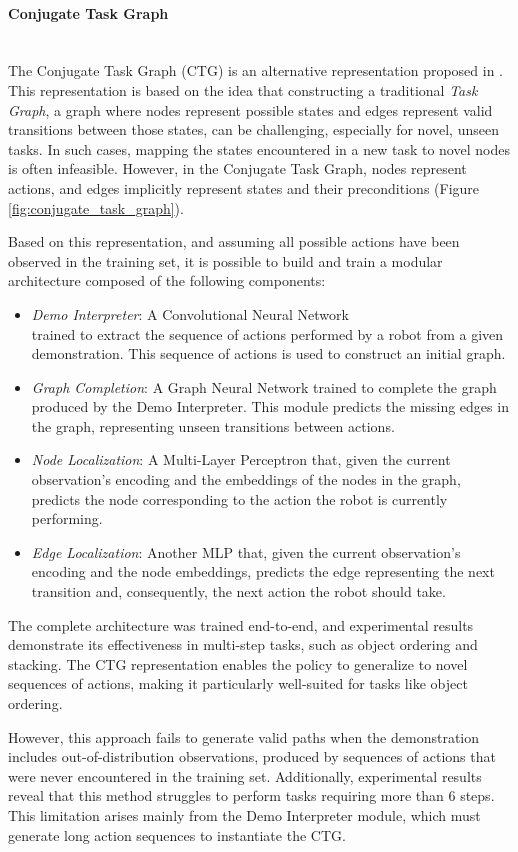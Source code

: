 \paragraph*{Conjugate Task Graph} \mbox{}\\
The Conjugate Task Graph (CTG) is an alternative representation proposed in \cite{huang2019neural}. This representation is based on the idea that constructing a traditional \textit{Task Graph}, a graph where nodes represent possible states and edges represent valid transitions between those states, can be challenging, especially for novel, unseen tasks. In such cases, mapping the states encountered in a new task to novel nodes is often infeasible. However, in the Conjugate Task Graph, nodes represent actions, and edges implicitly represent states and their preconditions (Figure \ref{fig:conjugate_task_graph}).

Based on this representation, and assuming all possible actions have been observed in the training set, it is possible to build and train a modular architecture composed of the following components:
\begin{itemize}
    \item \textit{Demo Interpreter}: A Convolutional Neural Network \\ trained to extract the sequence of actions performed by a robot from a given demonstration. This sequence of actions is used to construct an initial graph.
    
    \item \textit{Graph Completion}: A Graph Neural Network trained to complete the graph produced by the Demo Interpreter. This module predicts the missing edges in the graph, representing unseen transitions between actions.
    
    \item \textit{Node Localization}: A Multi-Layer Perceptron that, given the current observation's encoding and the embeddings of the nodes in the graph, predicts the node corresponding to the action the robot is currently performing.
    
    \item \textit{Edge Localization}: Another MLP that, given the current observation's encoding and the node embeddings, predicts the edge representing the next transition and, consequently, the next action the robot should take.
\end{itemize}

The complete architecture was trained end-to-end, and experimental results demonstrate its effectiveness in multi-step tasks, such as object ordering and stacking. The CTG representation enables the policy to generalize to novel sequences of actions, making it particularly well-suited for tasks like object ordering.

However, this approach fails to generate valid paths when the demonstration includes out-of-distribution observations, produced by sequences of actions that were never encountered in the training set. Additionally, experimental results reveal that this method struggles to perform tasks requiring more than 6 steps. This limitation arises mainly from the Demo Interpreter module, which must generate long action sequences to instantiate the CTG.
